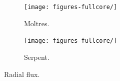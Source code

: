 \documentclass[11pt,letterpaper]{article}
\begin{document}
\begin{figure}[htbp!]
	\centering
	\begin{subfigure}[t]{0.4\textwidth}
		\centering
		\texttt{[image: figures-fullcore/]}
		\caption{Moltres.}
	\end{subfigure}
	\begin{subfigure}[t]{0.4\textwidth}
		\centering
		\texttt{[image: figures-fullcore/]}
		\caption{Serpent.}
	\end{subfigure}
	\hfill
	\caption{Radial flux.}
	\label{fig:fullcore-radial1}
\end{figure}

\pagebreak


\end{document}
